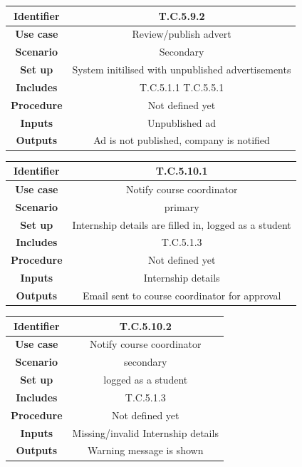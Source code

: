 \documentclass{l3deliverable}
\begin{document}
\begin{tabular}{|c|c|}
\hline \textbf{Identifier} & T.C.5.9.2\\
\hline \textbf{Use case} & Review/publish advert\\
\hline \textbf{Scenario} & Secondary\\
\hline \textbf{Set up} & System initilised with unpublished advertisements\\
\hline \textbf{Includes} & T.C.5.1.1 T.C.5.5.1\\
\hline \textbf{Procedure} & Not defined yet\\
\hline \textbf{Inputs} & Unpublished ad\\
\hline \textbf{Outputs} & Ad is not published, company is notified\\
\hline
\end{tabular}

\begin{tabular}{|c|c|}
\hline \textbf{Identifier} & T.C.5.10.1\\
\hline \textbf{Use case} & Notify course coordinator\\
\hline \textbf{Scenario} & primary\\
\hline \textbf{Set up} & Internship details are filled in, logged as a student\\
\hline \textbf{Includes} & T.C.5.1.3\\
\hline \textbf{Procedure} & Not defined yet\\
\hline \textbf{Inputs} & Internship details\\
\hline \textbf{Outputs} & Email sent to course coordinator for approval\\
\hline
\end{tabular}

\begin{tabular}{|c|c|}
\hline \textbf{Identifier} & T.C.5.10.2\\
\hline \textbf{Use case} & Notify course coordinator\\
\hline \textbf{Scenario} & secondary\\
\hline \textbf{Set up} & logged as a student\\
\hline \textbf{Includes} & T.C.5.1.3\\
\hline \textbf{Procedure} & Not defined yet\\
\hline \textbf{Inputs} & Missing/invalid Internship details\\
\hline \textbf{Outputs} & Warning message is shown\\
\hline
\end{tabular}
\end{document}
